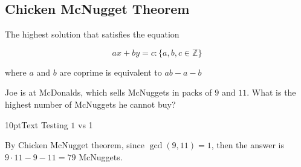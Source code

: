 \documentclass{scrreprt} %
\begin{document}
\subsection{Chicken McNugget Theorem}

The highest solution that satisfies the equation

$$
ax + by = c : \{a, b, c \in \mathbb{Z}\}
$$

where $a$ and $b$ are coprime is equivalent to $ab - a - b$

\begin{example}
	Joe is at McDonalds, which sells McNuggets in packs of $9$ and $11$.
	What is the highest number of McNuggets he cannot buy?
\end{example}

{\fontsize{10}{48} \selectfont 10ptText}
Testing $1$ vs 1

By Chicken McNugget theorem, since $\gcd(9, 11) = 1$, then the answer is
$9\cdot 11 - 9 - 11 = 79$ McNuggets.
\end{document}
